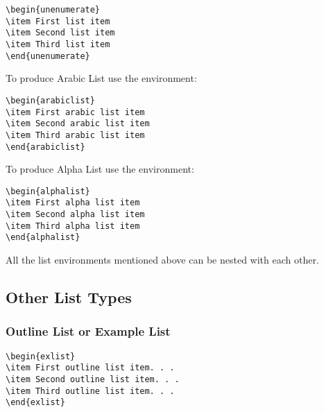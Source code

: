 \documentclass{clv3}
\begin{document}
\begin{verbatim}
\begin{unenumerate}
\item First list item
\item Second list item
\item Third list item
\end{unenumerate}
\end{verbatim}

To produce Arabic List use the environment:

\begin{verbatim}
\begin{arabiclist}
\item First arabic list item
\item Second arabic list item
\item Third arabic list item
\end{arabiclist}
\end{verbatim}

To produce Alpha List use the environment:

\begin{verbatim}
\begin{alphalist}
\item First alpha list item
\item Second alpha list item
\item Third alpha list item
\end{alphalist}
\end{verbatim}

All the list environments mentioned above can be nested with each other.

\subsection{Other List Types}

\subsubsection{Outline List or Example List}

\begin{verbatim}
\begin{exlist}
\item First outline list item. . .
\item Second outline list item. . .
\item Third outline list item. . .
\end{exlist}
\end{verbatim}
\end{document}
